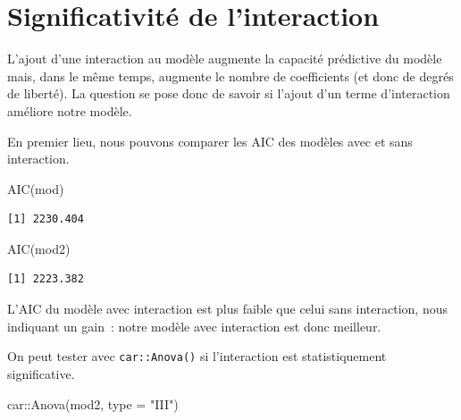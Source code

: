 \documentclass[
  letterpaper,
  DIV=11,
  numbers=noendperiod,
  oneside]{scrreprt}
\newenvironment{Shaded}{\begin{snugshade}}{\end{snugshade}}
\newcommand{\AttributeTok}[1]{\textcolor[rgb]{0.40,0.45,0.13}{#1}}
\newcommand{\FunctionTok}[1]{\textcolor[rgb]{0.28,0.35,0.67}{#1}}
\newcommand{\NormalTok}[1]{\textcolor[rgb]{0.00,0.23,0.31}{#1}}
\newcommand{\SpecialCharTok}[1]{\textcolor[rgb]{0.37,0.37,0.37}{#1}}
\newcommand{\StringTok}[1]{\textcolor[rgb]{0.13,0.47,0.30}{#1}}
\begin{document}
\hypertarget{significativituxe9-de-linteraction}{%
\section{Significativité de
l'interaction}\label{significativituxe9-de-linteraction}}

L'ajout d'une interaction au modèle augmente la capacité prédictive du
modèle mais, dans le même temps, augmente le nombre de coefficients (et
donc de degrés de liberté). La question se pose donc de savoir si
l'ajout d'un terme d'interaction améliore notre modèle.

En premier lieu, nous pouvons comparer les AIC des modèles avec et sans
interaction.

\begin{Shaded}
\begin{Highlighting}[]
\FunctionTok{AIC}\NormalTok{(mod)}
\end{Highlighting}
\end{Shaded}

\begin{verbatim}
[1] 2230.404
\end{verbatim}

\begin{Shaded}
\begin{Highlighting}[]
\FunctionTok{AIC}\NormalTok{(mod2)}
\end{Highlighting}
\end{Shaded}

\begin{verbatim}
[1] 2223.382
\end{verbatim}

L'AIC du modèle avec interaction est plus faible que celui sans
interaction, nous indiquant un gain~: notre modèle avec interaction est
donc meilleur.

On peut tester avec \texttt{car::Anova()} si l'interaction est
statistiquement significative.

\begin{Shaded}
\begin{Highlighting}[]
\NormalTok{car}\SpecialCharTok{::}\FunctionTok{Anova}\NormalTok{(mod2, }\AttributeTok{type =} \StringTok{"III"}\NormalTok{)}
\end{Highlighting}
\end{Shaded}
\end{document}
